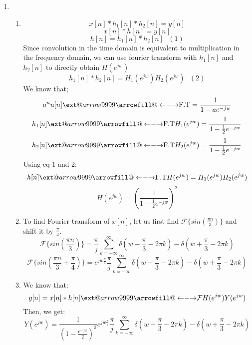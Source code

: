 \documentclass[10pt,a4paper, margin=1in]{article}
\makeatletter
\newcommand\xleftrightarrow[2][]{%
  \ext@arrow 9999{\longleftrightarrowfill@}{#1}{#2}}
\newcommand\longleftrightarrowfill@{%
  \arrowfill@\leftarrow\relbar\rightarrow}
\makeatother
\begin{document}
\begin{enumerate}
\item %
    \begin{enumerate}
    \item %
    \[x[n]\ast h_1[n] \ast h_2[n]=y[n]\]
    \[x[n]\ast h[n]=y[n]\]
    \[h[n]=h_1[n] \ast h_2[n]  \ \ \ (1)\]
    Since convolution in the time domain is equivalent to multiplication in the frequency domain, we can use fourier transform with $h_1[n]$ and $h_2[n]$ to directly obtain
    $H(e^{jw})$\\
    \[h_1[n] \ast h_2[n]=H_1(e^{jw})H_2(e^{jw}) \ \ \ (2) \]
    We know that;
    \[a^nu[n]\xleftrightarrow[\text{}]{\text{F.T}}=\frac{1}{1-ae^{-jw}}\]
    \[h_1[n] \xleftrightarrow[\text{}]{\text{F.T}} H_1(e^{jw})=\frac{1}{1-\frac{1}{2}e^{-jw}}\]
    \[h_2[n] \xleftrightarrow[\text{}]{\text{F.T}} H_2(e^{jw})=\frac{1}{1-\frac{1}{2}e^{-jw}}\]
    Using eq 1 and 2:
    \[h[n]\xleftrightarrow[\text{}]{\text{F.T}}H(e^{jw})=H_1(e^{jw})H_2(e^{jw})\]
     \[H(e^{jw})=(\frac{1}{1-\frac{1}{2}e^{-jw}})^2\]
    \item %
    To find Fourier transform of $x[n]$, let us first find $\mathcal{F}\{sin(\frac{\pi n}{3})\}$ and shift it by $\frac{\pi}{4}$.
    \[\mathcal{F}\{sin(\frac{\pi n}{3})\} = \frac{\pi}{j} \sum_{k = -\infty}^{\infty} \delta(w - \frac{\pi}{3} - 2\pi k) - \delta(w +  \frac{\pi}{3} - 2 \pi k)\]
    \[\mathcal{F}\{sin(\frac{\pi n}{3} + \frac{\pi}{4})\} = e^{jw\frac{\pi}{4}}\frac{\pi}{j} \sum_{k = -\infty}^{\infty} \delta(w - \frac{\pi}{3} - 2\pi k) - \delta(w +  \frac{\pi}{3} - 2 \pi k)\]
    \item %
    We know that:
    \[y[n] = x[n] \ast h[n] \xleftrightarrow[\text{}]{\text{$\mathcal{F}$}} H(e^{jw})Y(e^{jw})\]
    Then, we get: 
    \[Y(e^{jw}) = \frac{1}{(1 - \frac{e^{-jw}}{2})^2}e^{jw\frac{\pi}{4}}\frac{\pi}{j} \sum_{k = -\infty}^{\infty} \delta(w - \frac{\pi}{3} - 2\pi k) - \delta(w +  \frac{\pi}{3} - 2 \pi k)\]
    \end{enumerate}


\end{enumerate}
\end{document}
